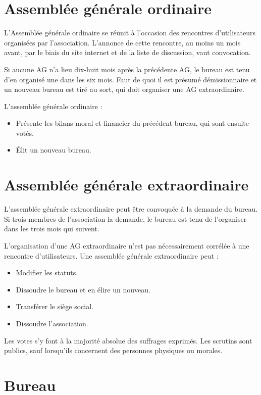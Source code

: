 \documentclass[11pt]{article}
\begin{document}
\section{Assemblée générale ordinaire}

L'Assemblée générale ordinaire se réunit à l'occasion des rencontres d'utilisateurs organisées par l'association. 
L'annonce de cette rencontre, au moins un mois avant, par le biais du site internet et de la liste de discussion, vaut convocation.

Si aucune AG n'a lieu dix-huit mois après la précédente AG, le bureau est tenu d'en organisé une dans les six mois.
Faut de quoi il est présumé démissionnaire et un nouveau bureau est tiré au sort, qui doit organiser une AG extraordinaire.

L'assemblée générale ordinaire :
\begin{itemize}
	\item Présente les bilans moral et financier du précédent bureau, qui sont ensuite votés.
	\item Élit un nouveau bureau.
\end{itemize}


\section{Assemblée générale extraordinaire}

L'assemblée générale extraordinaire peut être convoquée à la demande du bureau. Si trois membres de l'association la demande, le bureau est tenu de l'organiser dans les trois mois qui suivent.

L'organisation d'une AG extraordinaire n'est pas nécessairement corrélée à une rencontre d'utilisateurs. 
Une assemblée générale extraordinaire peut :
\begin{itemize}
	\item Modifier les statuts.
	\item Dissoudre le bureau et en élire un nouveau.
	\item Transférer le siège social.
	\item Dissoudre l'association.
\end{itemize}

Les votes s'y font à la majorité absolue des suffrages exprimés. Les scrutins sont publics, sauf lorsqu'ils concernent des personnes physiques ou morales.


\section{Bureau}
\end{document}
